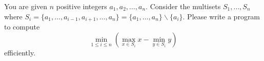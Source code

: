 You are given $n$ positive integers $a_1,a_2,\ldots,a_n$. 
Consider the multisets $S_1,\dots,S_n$ where 
$S_i=\{a_1,\dots,a_{i-1},a_{i+1},\dots,a_n\}=\{a_1,\dots,a_n\}\backslash\{a_i\}$. 
Please write a program to compute $$\min_{1\le i\le n}\left(\max_{x\in S_i}x-\min_{y\in S_i}y\right)$$
efficiently.

